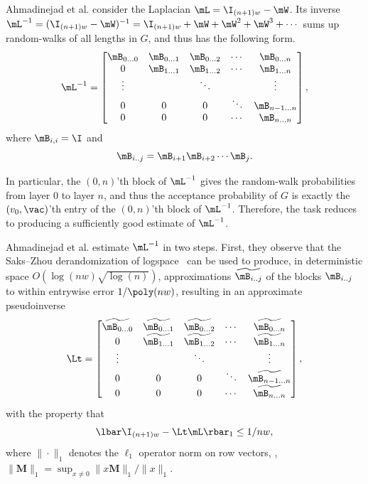 \documentclass{toc}
\begin{document}
%
Ahmadinejad  %
et al. consider the Laplacian $\mL = \I_{(n+1)w} - \mW$.  Its
   inverse $\mL^{-1} = (\I_{(n+1)w}-\mW)^{-1} = \I_{(n+1)w}+\mW+\mW^2+\mW^3+\cdots$ sums up random-walks of all lengths in $G$, and thus has the following form. %
   $$\mL^{-1} =
   \begin{bmatrix}
    \mB_{0\ldots0} & \mB_{0\ldots 1} & \mB_{0\ldots 2} & \cdots & \mB_{0\ldots n} \\
    0 & \mB_{1\ldots 1} & \mB_{1\ldots 2} & \cdots & \mB_{1\ldots n} \\
    \vdots & & \ddots & & \vdots\\
    0 & 0 & 0 & \ddots & \mB_{n-1\ldots n}\\
    0 & 0 & 0 & \cdots &  \mB_{n\ldots n} \\
    \end{bmatrix},$$
   where $\mB_{i,i}=\I$ and 
   $$\mB_{i .. j} = \mB_{i+1}\mB_{i+2}\cdots \mB_j.$$
   
   In particular, the $(0,n)$'th block of $\mL^{-1}$ gives the random-walk
   probabilities from layer $0$ to layer $n$, and thus the acceptance probability
   of $G$ is exactly the $(v_0,\vac)$'th entry of the $(0,n)$'th block of $\mL^{-1}$.  Therefore, the task reduces to producing a sufficiently good estimate of $\mL^{-1}$.
   
%
Ahmadinejad  %
et al. estimate $\mL^{-1}$  in two steps.  First, they observe that the Saks--Zhou derandomization of logspace~\cite{SaksZh99} can be used to produce,
   in deterministic space $O(\log(nw)\sqrt{\log(n)})$, %
   approximations %
   $\widetilde{\mB_{i .. j}}$ of the blocks $\mB_{i .. j}$ to within entrywise error $1/\poly(nw)$, resulting in an approximate pseudoinverse
   \begin{equation}
       \Lt =
   \begin{bmatrix}
    \widetilde{\mB_{0\ldots0}} & \widetilde{\mB_{0\ldots 1}} & \widetilde{\mB_{0\ldots 2}} & \cdots & \widetilde{\mB_{0\ldots n}} \\
    0 & \widetilde{\mB_{1\ldots 1}} & \widetilde{\mB_{1\ldots 2}} & \cdots & \widetilde{\mB_{1\ldots n}} \\
    \vdots & & \ddots & & \vdots\\
    0 & 0 & 0 & \ddots & \widetilde{\mB_{n-1\ldots n}}\\
    0 & 0 & 0 & \cdots &  \widetilde{\mB_{n\ldots n}} \\
    \end{bmatrix},\label{eqn:path-inverse}
   \end{equation}
   with the property that
   $$\lbar \I_{(n+1)w}-\Lt \mL\rbar_{1}\leq 1/nw,$$
   where $\|\cdot\|_1$ denotes the $\ell_1$ operator norm on row vectors, \ie, $\|\mathbf{M}\|_1 =\sup_{x\neq 0}\|x\mathbf{M}\|_{1}/\|x\|_{1}$.
\end{document}
